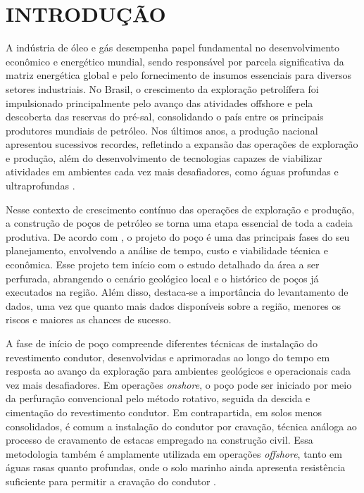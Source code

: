 \chapter{INTRODUÇÃO}

A indústria de óleo e gás desempenha papel fundamental no desenvolvimento econômico e energético mundial, sendo responsável por parcela significativa da matriz energética global e pelo fornecimento de insumos essenciais para diversos setores industriais. No Brasil, o crescimento da exploração petrolífera foi impulsionado principalmente pelo avanço das atividades offshore e pela descoberta das reservas do pré-sal, consolidando o país entre os principais produtores mundiais de petróleo. Nos últimos anos, a produção nacional apresentou sucessivos recordes, refletindo a expansão das operações de exploração e produção, além do desenvolvimento de tecnologias capazes de viabilizar atividades em ambientes cada vez mais desafiadores, como águas profundas e ultraprofundas \cite{IBP2024,ANP2026}.

Nesse contexto de crescimento contínuo das operações de exploração e produção, a construção de poços de petróleo se torna uma etapa essencial de toda a cadeia produtiva. De acordo com , o projeto do poço é uma das principais fases do seu planejamento, envolvendo a análise de tempo, custo e viabilidade técnica e econômica. Esse projeto tem início com o estudo detalhado da área a ser perfurada, abrangendo o cenário geológico local e o histórico de poços já executados na região. Além disso, destaca-se a importância do levantamento de dados, uma vez que quanto mais dados disponíveis sobre a região, menores os riscos e maiores as chances de sucesso. 

A fase de início de poço compreende diferentes técnicas de instalação do revestimento condutor, desenvolvidas e aprimoradas ao longo do tempo em resposta ao avanço da exploração para ambientes geológicos e operacionais cada vez mais desafiadores. Em operações \textit{onshore}, o poço pode ser iniciado por meio da perfuração convencional pelo método rotativo, seguida da descida e cimentação do revestimento condutor. Em contrapartida, em solos menos consolidados, é comum a instalação do condutor por cravação, técnica análoga ao processo de cravamento de estacas empregado na construção civil. Essa metodologia também é amplamente utilizada em operações \textit{offshore}, tanto em águas rasas quanto profundas, onde o solo marinho ainda apresenta resistência suficiente para permitir a cravação do condutor \cite{malouf2013}.

